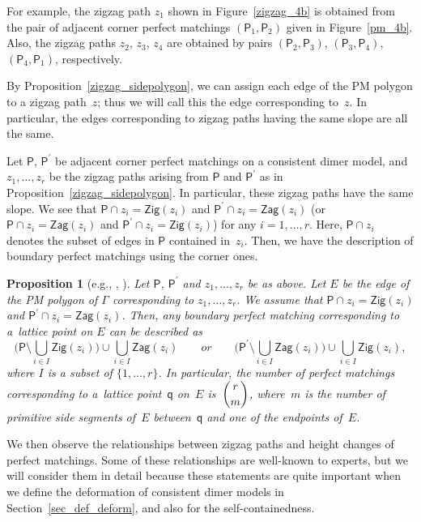 \documentclass[11pt]{article}
\numberwithin{equation}{section}
\numberwithin{equation}{section}
\numberwithin{figure}{section}
\numberwithin{table}{section}
\newtheorem{Proposition}[Theorem]{Proposition}
 { \theoremstyle{definition}
\newtheorem{Definition}[Theorem]{Definition}
\newtheorem{Note}[Theorem]{Note}
\newtheorem{Example}[Theorem]{Example}
\newtheorem{Remark}[Theorem]{Remark}
\newtheorem{observation}[Theorem]{Observation}
\newtheorem{operation}[Theorem]{Operation}
\newtheorem{setting}[Theorem]{Setting}}
\newcommand{\sfP}{\mathsf{P}}
\newcommand{\Zig}{\mathsf{Zig}}
\newcommand{\Zag}{\mathsf{Zag}}
\begin{document}
For example, the zigzag path $z_1$ shown in Figure~\ref{zigzag_4b} is obtained from the pair of adjacent corner perfect matchings $(\sfP_1,\sfP_2)$ given in Figure~\ref{pm_4b}. Also, the zigzag paths $z_2$, $z_3$, $z_4$ are obtained by pairs $(\sfP_2,\sfP_3)$, $(\sfP_3,\sfP_4)$, $(\sfP_4,\sfP_1)$, respectively.

By Proposition~\ref{zigzag_sidepolygon}, we can assign each edge of the PM polygon to a zigzag path~$z$;
thus we will call this the edge corresponding to~$z$.
In particular, the edges corresponding to zigzag paths having the same slope are all the same.

Let $\sfP$, $\sfP^\prime$ be adjacent corner perfect matchings on a consistent dimer model, and $z_1,\dots, z_r$ be the zigzag paths arising from $\sfP$ and $\sfP^\prime$ as in Proposition~\ref{zigzag_sidepolygon}.
In particular, these zigzag paths have the same slope.
We see that $\sfP\cap z_i=\Zig(z_i)$ and $\sfP^\prime\cap z_i=\Zag(z_i)$ (or $\sfP\cap z_i=\Zag(z_i)$ and $\sfP^\prime\cap z_i=\Zig(z_i)$) for any $i=1,\dots,r$. Here, $\sfP\cap z_i$ denotes the subset of edges in $\sfP$ contained in~$z_i$.
Then, we have the description of boundary perfect matchings using the corner ones.

\begin{Proposition}[{e.g., \cite[Proposition~4.35]{Bro}, \cite[Corollary~3.8]{Gul}}]\label{char_bound}
Let $\sfP$, $\sfP^\prime$ and $z_1,\dots, z_r$ be as above.
Let $E$ be the edge of the PM polygon of $\Gamma$ corresponding to $z_1,\dots, z_r$.
We assume that $\sfP\cap z_i=\Zig(z_i)$ and $\sfP^\prime\cap z_i=\Zag(z_i)$.
Then, any boundary perfect matching corresponding to a~lattice point on $E$ can be described as
\begin{displaymath}
\bigg(\sfP{\setminus}\bigcup_{i\in I}\Zig(z_i)\bigg)\cup\bigcup_{i\in I}\Zag(z_i) \qquad or \qquad \bigg(\sfP^\prime{\setminus}\bigcup_{i\in I}\Zag(z_i)\bigg)\cup\bigcup_{i\in I}\Zig(z_i),
\end{displaymath}
where $I$ is a subset of $\{1, \dots, r\}$.
In particular, the number of perfect matchings corresponding to a~lattice point~$\mathsf{q}$ on~$E$ is~$\dbinom{r}{m}$,
where~$m$ is the number of primitive side segments of~$E$ between~$\mathsf{q}$ and one of the endpoints of~$E$.
\end{Proposition}

We then observe the relationships between zigzag paths and height changes of perfect matchings.
Some of these relationships are well-known to experts, but we will consider them in detail because these statements are quite important
when we define the deformation of consistent dimer models in Section~\ref{sec_def_deform}, and also for the self-containedness.
\end{document}
